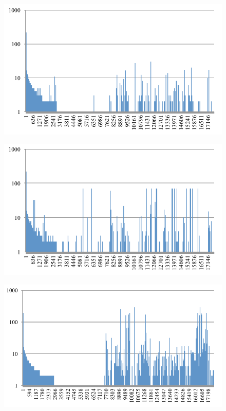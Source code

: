 \documentclass[conference]{IEEEtran}
\newlength{\graphwidth}
\begin{document}
\begin{figure}[bt]
\begin{minipage}[b]{\graphwidth}
    \label{fig:asm-5gram-PG-histogram}%
  \end{minipage}
  \vspace{0.5cm}
  \begin{minipage}[b]{\graphwidth}
    \includegraphics[clip,width=1.0\columnwidth]{images/DR_ASM}%
    \label{fig:asm-5gram-DR-histogram}%
  \end{minipage}
  \hfill
  \begin{minipage}[b]{\graphwidth}
    \includegraphics[clip,width=1.0\columnwidth]{images/IRR_ASM}%
    \label{fig:asm-5gram-IRR-histogram}%
  \end{minipage}
  \hfill
  \begin{minipage}[b]{\graphwidth}
    \includegraphics[clip,width=1.0\columnwidth]{images/MLI_ASM}%

\end{minipage}
\end{figure}
\end{document}
